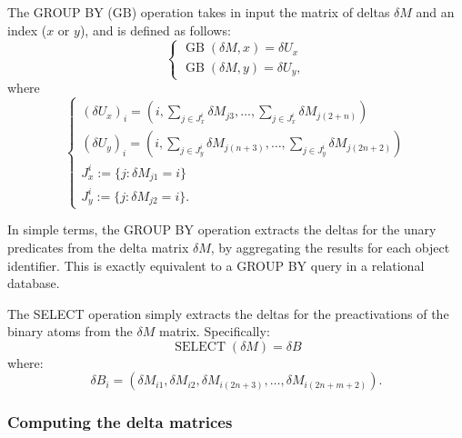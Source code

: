 \begin{definition}[GROUP BY]
	The GROUP BY ($\text{GB}$) operation takes in input the matrix of deltas $\delta M$ and an index ($x$ or $y$), and is defined as follows:
	\begin{equation*}
	\begin{cases}
	\operatorname{GB}(\delta M, x)= \delta U_x\\
	\operatorname{GB}(\delta M, y)= \delta U_y,
	\end{cases}
	\end{equation*}	
	where 
\textcolor{unipd}{	
	\begin{equation*}
	\begin{cases}
	\left(\delta U_x \right)_i = \left(i, \sum_{j\in J^i_x}\delta M_{j3},\dots, \sum_{j \in J^i_x}\delta M_{j(2+n)}\right)\\
	\left(\delta U_y \right)_i = \left(i, \sum_{j\in J^i_y}\delta M_{j(n+3)},\dots, \sum_{j \in J^i_y}\delta M_{j(2n+2)}\right)\\
	J^i_x:=\{j:\delta M_{j1}=i\}\\
	J^i_y:=\{j:\delta M_{j2}=i\}.
	\end{cases}
	\end{equation*}}
\end{definition}
In simple terms, the GROUP BY operation extracts the deltas for the unary predicates from the delta matrix $\delta M$, by aggregating the results for each object identifier. This is exactly equivalent to a GROUP BY query in a relational database.

\begin{definition}[SELECT]
\textcolor{unipd}{The SELECT operation simply extracts the deltas for the preactivations of the binary atoms }from the $\delta M$ matrix. Specifically:
$$\operatorname{SELECT}(\delta M) = \delta B $$
where:
$$\delta B_i = \left(\delta M_{i1}, \delta M_{i2}, \delta M_{i(2n+3)},\dots, \delta M_{i(2n+m+2)}\right).$$
\end{definition}

\subsubsection{Computing the delta matrices} 

